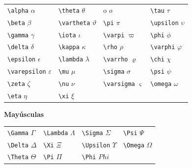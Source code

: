 \documentclass[
  letterpaper,
  DIV=11,
  numbers=noendperiod]{scrreport}
\begin{document}
\begin{longtable}[]{@{}
  >{\raggedright\arraybackslash}p{}
  >{\raggedright\arraybackslash}p{}
  >{\raggedright\arraybackslash}p{}
  >{\raggedright\arraybackslash}p{}@{}}
\toprule()
\endhead
\texttt{\textbackslash{}alpha} \(\alpha\) &
\texttt{\textbackslash{}theta} \(\theta\) & o \(o\) &
\texttt{\textbackslash{}tau} \(\tau\) \\
\texttt{\textbackslash{}beta} \(\beta\) &
\texttt{\textbackslash{}vartheta} \(\vartheta\) &
\texttt{\textbackslash{}pi} \(\pi\) & \texttt{\textbackslash{}upsilon}
\(\upsilon\) \\
\texttt{\textbackslash{}gamma} \(\gamma\) &
\texttt{\textbackslash{}iota} \(\iota\) & \texttt{\textbackslash{}varpi}
\(\varpi\) & \texttt{\textbackslash{}phi} \(\phi\) \\
\texttt{\textbackslash{}delta} \(\delta\) &
\texttt{\textbackslash{}kappa} \(\kappa\) & \texttt{\textbackslash{}rho}
\(\rho\) & \texttt{\textbackslash{}varphi} \(\varphi\) \\
\texttt{\textbackslash{}epsilon} \(\epsilon\) &
\texttt{\textbackslash{}lambda} \(\lambda\) &
\texttt{\textbackslash{}varrho} \(\varrho\) &
\texttt{\textbackslash{}chi} \(\chi\) \\
\texttt{\textbackslash{}varepsilon} \(\varepsilon\) &
\texttt{\textbackslash{}mu} \(\mu\) & \texttt{\textbackslash{}sigma}
\(\sigma\) & \texttt{\textbackslash{}psi} \(\psi\) \\
\texttt{\textbackslash{}zeta} \(\zeta\) & \texttt{\textbackslash{}nu}
\(\nu\) & \texttt{\textbackslash{}varsigma} \(\varsigma\) &
\texttt{\textbackslash{}omega} \(\omega\) \\
\texttt{\textbackslash{}eta} \(\eta\) & \texttt{\textbackslash{}xi}
\(\xi\) & & \\
\bottomrule()
\end{longtable}

\textbf{Mayúsculas}

\begin{longtable}[]{@{}
  >{\raggedright\arraybackslash}p{}
  >{\raggedright\arraybackslash}p{}
  >{\raggedright\arraybackslash}p{}
  >{\raggedright\arraybackslash}p{}@{}}
\toprule()
\endhead
\texttt{\textbackslash{}Gamma} \(\Gamma\) &
\texttt{\textbackslash{}Lambda} \(\Lambda\) &
\texttt{\textbackslash{}Sigma} \(\Sigma\) & \texttt{\textbackslash{}Psi}
\(\Psi\) \\
\texttt{\textbackslash{}Delta} \(\Delta\) & \texttt{\textbackslash{}Xi}
\(\Xi\) & \texttt{\textbackslash{}Upsilon} \(\Upsilon\) &
\texttt{\textbackslash{}Omega} \(\Omega\) \\
\texttt{\textbackslash{}Theta} \(\Theta\) & \texttt{\textbackslash{}Pi}
\(\Pi\) & \texttt{\textbackslash{}Phi} \(Phi\) & \\
\bottomrule()
\end{longtable}
\end{document}
